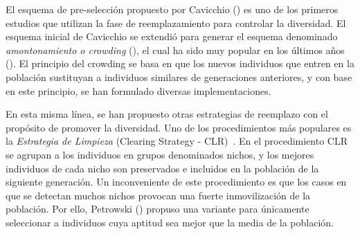 El esquema de pre-selección propuesto por Cavicchio (\cite{grefenstette1986optimization}) es uno de los primeros estudios que utilizan la fase de reemplazamiento para controlar la diversidad.
%
El esquema inicial de Cavicchio se extendió para generar el esquema denominado \textit{amontonamiento o crowding} (\cite{de1975analysis}), el cual ha sido muy popular 
en los últimos años (\cite{mahfoud1992crowding, mengshoel2014adaptive}).
%
El principio del crowding se basa en que los nuevos individuos que entren en la población sustituyan a individuos similares de generaciones anteriores, y con base en este principio, se han formulado diversas implementaciones.

En esta misma línea, se han propuesto otras estrategias de reemplazo con el propósito de promover la diversidad.
%
Uno de los procedimientos más populares es la \textit{Estrategia de Limpieza} (Clearing Strategy - CLR)~\cite{lozano2008replacement}.
%
En el procedimiento CLR se agrupan a los individuos en grupos denominados nichos, y los mejores individuos de cada nicho son preservados e incluidos en la población de la siguiente generación.
%
Un inconveniente de este procedimiento es que los casos en que se detectan muchos nichos provocan una fuerte inmovilización de la población.
%
Por ello, Petrowski (\cite{petrowski1996clearing}) propuso una variante para únicamente seleccionar a individuos cuya aptitud sea mejor que la media de la población.



